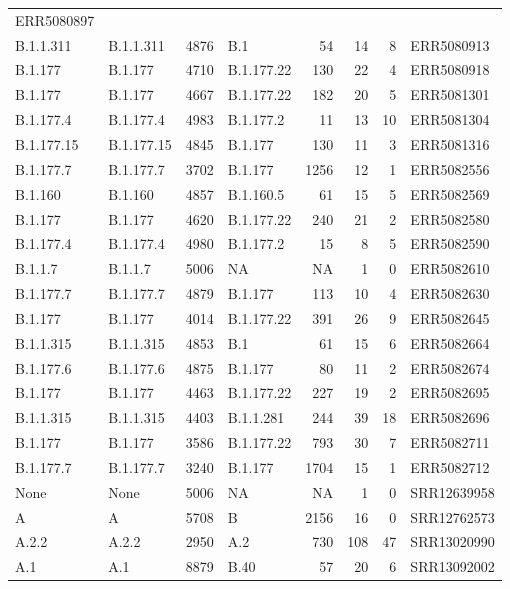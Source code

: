 \documentclass[
]{article}
\begin{document}
\begin{longtable}[]{@{}llrlrrrl@{}}
ERR5080897\tabularnewline
B.1.1.311 & B.1.1.311 & 4876 & B.1 & 54 & 14 & 8 &
ERR5080913\tabularnewline
B.1.177 & B.1.177 & 4710 & B.1.177.22 & 130 & 22 & 4 &
ERR5080918\tabularnewline
B.1.177 & B.1.177 & 4667 & B.1.177.22 & 182 & 20 & 5 &
ERR5081301\tabularnewline
B.1.177.4 & B.1.177.4 & 4983 & B.1.177.2 & 11 & 13 & 10 &
ERR5081304\tabularnewline
B.1.177.15 & B.1.177.15 & 4845 & B.1.177 & 130 & 11 & 3 &
ERR5081316\tabularnewline
B.1.177.7 & B.1.177.7 & 3702 & B.1.177 & 1256 & 12 & 1 &
ERR5082556\tabularnewline
B.1.160 & B.1.160 & 4857 & B.1.160.5 & 61 & 15 & 5 &
ERR5082569\tabularnewline
B.1.177 & B.1.177 & 4620 & B.1.177.22 & 240 & 21 & 2 &
ERR5082580\tabularnewline
B.1.177.4 & B.1.177.4 & 4980 & B.1.177.2 & 15 & 8 & 5 &
ERR5082590\tabularnewline
B.1.1.7 & B.1.1.7 & 5006 & NA & NA & 1 & 0 & ERR5082610\tabularnewline
B.1.177.7 & B.1.177.7 & 4879 & B.1.177 & 113 & 10 & 4 &
ERR5082630\tabularnewline
B.1.177 & B.1.177 & 4014 & B.1.177.22 & 391 & 26 & 9 &
ERR5082645\tabularnewline
B.1.1.315 & B.1.1.315 & 4853 & B.1 & 61 & 15 & 6 &
ERR5082664\tabularnewline
B.1.177.6 & B.1.177.6 & 4875 & B.1.177 & 80 & 11 & 2 &
ERR5082674\tabularnewline
B.1.177 & B.1.177 & 4463 & B.1.177.22 & 227 & 19 & 2 &
ERR5082695\tabularnewline
B.1.1.315 & B.1.1.315 & 4403 & B.1.1.281 & 244 & 39 & 18 &
ERR5082696\tabularnewline
B.1.177 & B.1.177 & 3586 & B.1.177.22 & 793 & 30 & 7 &
ERR5082711\tabularnewline
B.1.177.7 & B.1.177.7 & 3240 & B.1.177 & 1704 & 15 & 1 &
ERR5082712\tabularnewline
None & None & 5006 & NA & NA & 1 & 0 & SRR12639958\tabularnewline
A & A & 5708 & B & 2156 & 16 & 0 & SRR12762573\tabularnewline
A.2.2 & A.2.2 & 2950 & A.2 & 730 & 108 & 47 & SRR13020990\tabularnewline
A.1 & A.1 & 8879 & B.40 & 57 & 20 & 6 & SRR13092002\tabularnewline
\bottomrule
\end{longtable}

\renewcommand\refname{Bibliography}
  
\end{document}
